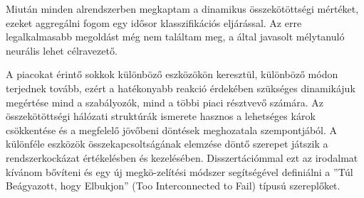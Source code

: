 \documentclass[12pt,bibliography=totoc]{article}
\begin{document}
Miután minden alrendszerben megkaptam a dinamikus összekötöttségi mértéket, ezeket aggregálni fogom egy idősor klasszifikációs eljárással. Az erre legalkalmasabb megoldást még nem találtam meg, a \cite{fawaz2020inceptiontime} által javasolt mélytanuló neurális lehet célravezető.

A piacokat érintő sokkok különböző eszközökön keresztül, különböző módon terjednek tovább, ezért a hatékonyabb reakció érdekében szükséges dinamikájuk megértése mind a szabályozók, mind a többi piaci résztvevő számára. Az összekötöttségi hálózati struktúrák ismerete hasznos a lehetséges károk csökkentése és a megfelelő jövőbeni döntések meghozatala szempontjából. A különféle eszközök összekapcsoltságának elemzése döntő szerepet játszik a rendszerkockázat értékelésben és kezelésében. Disszertációmmal ezt az irodalmat kívánom bővíteni és egy új megkö-zelítési módszer segítségével definiálni a ''Túl Beágyazott, hogy Elbukjon'' (Too Interconnected to Fail) típusú szereplőket.

\newpage






\end{document}
